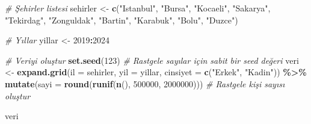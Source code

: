 \documentclass[
]{article}
\newenvironment{Shaded}{\begin{snugshade}}{\end{snugshade}}
\newcommand{\AttributeTok}[1]{\textcolor[rgb]{0.13,0.29,0.53}{#1}}
\newcommand{\CommentTok}[1]{\textcolor[rgb]{0.56,0.35,0.01}{\textit{#1}}}
\newcommand{\DecValTok}[1]{\textcolor[rgb]{0.00,0.00,0.81}{#1}}
\newcommand{\FunctionTok}[1]{\textcolor[rgb]{0.13,0.29,0.53}{\textbf{#1}}}
\newcommand{\NormalTok}[1]{#1}
\newcommand{\OtherTok}[1]{\textcolor[rgb]{0.56,0.35,0.01}{#1}}
\newcommand{\SpecialCharTok}[1]{\textcolor[rgb]{0.81,0.36,0.00}{\textbf{#1}}}
\newcommand{\StringTok}[1]{\textcolor[rgb]{0.31,0.60,0.02}{#1}}
\begin{document}
\begin{Shaded}
\begin{Highlighting}[]
\CommentTok{\# Şehirler listesi}
\NormalTok{sehirler }\OtherTok{\textless{}{-}} \FunctionTok{c}\NormalTok{(}\StringTok{"Istanbul"}\NormalTok{, }\StringTok{"Bursa"}\NormalTok{, }\StringTok{"Kocaeli"}\NormalTok{, }\StringTok{"Sakarya"}\NormalTok{, }\StringTok{"Tekirdag"}\NormalTok{, }
              \StringTok{"Zonguldak"}\NormalTok{, }\StringTok{"Bartin"}\NormalTok{, }\StringTok{"Karabuk"}\NormalTok{, }\StringTok{"Bolu"}\NormalTok{, }\StringTok{"Duzce"}\NormalTok{)}

\CommentTok{\# Yıllar}
\NormalTok{yillar }\OtherTok{\textless{}{-}} \DecValTok{2019}\SpecialCharTok{:}\DecValTok{2024}

\CommentTok{\# Veriyi oluştur}
\FunctionTok{set.seed}\NormalTok{(}\DecValTok{123}\NormalTok{) }\CommentTok{\# Rastgele sayılar için sabit bir seed değeri}
\NormalTok{veri }\OtherTok{\textless{}{-}} \FunctionTok{expand.grid}\NormalTok{(}\AttributeTok{il =}\NormalTok{ sehirler, }\AttributeTok{yil =}\NormalTok{ yillar, }\AttributeTok{cinsiyet =} \FunctionTok{c}\NormalTok{(}\StringTok{"Erkek"}\NormalTok{, }\StringTok{"Kadin"}\NormalTok{)) }\SpecialCharTok{\%\textgreater{}\%}
  \FunctionTok{mutate}\NormalTok{(}\AttributeTok{sayi =} \FunctionTok{round}\NormalTok{(}\FunctionTok{runif}\NormalTok{(}\FunctionTok{n}\NormalTok{(), }\DecValTok{500000}\NormalTok{, }\DecValTok{2000000}\NormalTok{))) }\CommentTok{\# Rastgele kişi sayısı oluştur}

\NormalTok{veri}
\end{Highlighting}
\end{Shaded}
\end{document}
